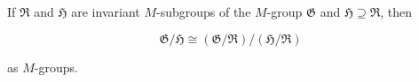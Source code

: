 If $\mathfrak{R}$ and $\mathfrak{H}$ are invariant $M$-subgroups of the $M$-group $\mathfrak{G}$ and $\mathfrak{H} \supseteq \mathfrak{R}$, then

$$\mathfrak{G}/\mathfrak{H} \cong (\mathfrak{G}/\mathfrak{R})/(\mathfrak{H}/\mathfrak{R})$$

as $M$-groups.
